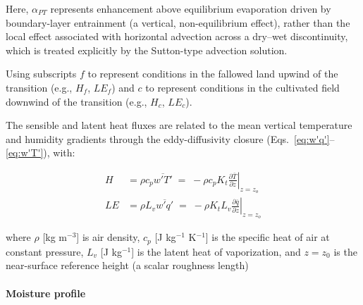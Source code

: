 \documentclass{article}
\begin{document}
    Here, $\alpha_{PT}$ represents enhancement above equilibrium evaporation driven by boundary-layer entrainment (a vertical, non-equilibrium effect), rather than the local effect associated with horizontal advection across a dry--wet discontinuity, which is treated explicitly by the Sutton-type advection solution. 
    
    
    
    
    Using  subscripts $f$  to represent conditions in the fallowed land upwind of the transition (e.g., $H_f$, $LE_f$)  and $c$ to represent conditions in the cultivated field downwind of the transition (e.g., $H_c$, $LE_c$).
    
    The sensible and latent heat fluxes are related to the mean vertical temperature and humidity gradients through the eddy-diffusivity closure (Eqs.~\ref{eq:w'q'}--\ref{eq:w'T'}), with: 
    
    \begin{align}
    \label{eq:H_kinematic}
    H  &= \rho c_p\overline{w'T'} \;=\; -\rho c_p K_t\left.\frac{\partial \overline{T}}{\partial z}\right|_{z=z_o}\\
    \label{eq:LE_kinematic}
    LE &= \rho L_v \overline{w'q'} \;=\; -\rho K_t L_v\left.\frac{\partial \overline{q}}{\partial z}\right|_{z=z_o}
    \end{align}
    
    \noindent where
     $\rho$ [kg m$^{-3}$] is air density,  $c_p$ [J kg$^{-1}$ K$^{-1}$] is the specific heat of air at constant pressure,
     $L_v$ [J kg$^{-1}$] is the latent heat of vaporization, and $z=z_0$ is the  near-surface reference height  (a scalar roughness length)
    
    
    \paragraph{Moisture profile}
    
\end{document}
